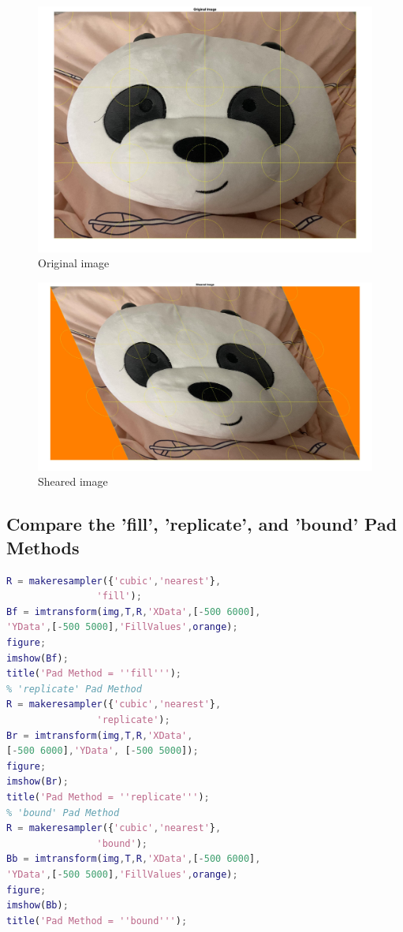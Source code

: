 \documentclass[conference]{IEEEtran}
\begin{document}
\begin{figure}[h!]
\centering
\includegraphics[width=0.8\linewidth]{images/img29.jpg}
\caption{Original image}
\label{fig:abc}
\end{figure}

\begin{figure}[h!]
\centering
\includegraphics[width=0.8\linewidth]{images/img30.jpg}
\caption{Sheared image}
\label{fig:xyz}
\end{figure}

\subsection{Compare the 'fill', 'replicate', and 'bound' Pad Methods}
\begin{lstlisting}[language=Matlab]
% 'fill' Pad Method
R = makeresampler({'cubic','nearest'},
                'fill');
Bf = imtransform(img,T,R,'XData',[-500 6000],
'YData',[-500 5000],'FillValues',orange);
figure;
imshow(Bf);
title('Pad Method = ''fill''');
% 'replicate' Pad Method
R = makeresampler({'cubic','nearest'},
                'replicate');
Br = imtransform(img,T,R,'XData',
[-500 6000],'YData', [-500 5000]);
figure;
imshow(Br);
title('Pad Method = ''replicate''');
% 'bound' Pad Method
R = makeresampler({'cubic','nearest'}, 
                'bound');
Bb = imtransform(img,T,R,'XData',[-500 6000],
'YData',[-500 5000],'FillValues',orange);
figure;
imshow(Bb);
title('Pad Method = ''bound''');
\end{lstlisting}
\end{document}
